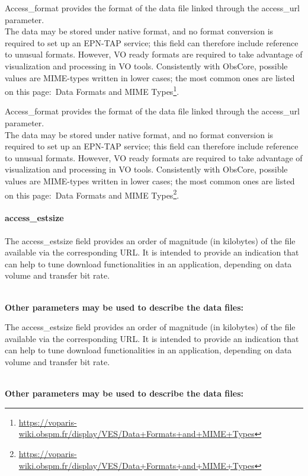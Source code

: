 \documentclass[11pt,a4paper]{ivoa}
\begin{document}
Access\_format provides the format of the data file linked through the access\_url parameter. \\The data may be stored under native format, and no format conversion is required to set up an EPN-TAP service; this field can therefore include reference to unusual formats. However, VO ready formats are required to take advantage of visualization and processing in VO tools. Consistently with ObsCore, possible values are MIME-types written in lower cases; the most common ones are listed on this page: Data Formats and MIME Types\footnote{\url{https://voparis-wiki.obspm.fr/display/VES/Data+Formats+and+MIME+Types}}.

Access\_format provides the format of the data file linked through the access\_url parameter. \\The data may be stored under native format, and no format conversion is required to set up an EPN-TAP service; this field can therefore include reference to unusual formats. However, VO ready formats are required to take advantage of visualization and processing in VO tools. Consistently with ObsCore, possible values are MIME-types written in lower cases; the most common ones are listed on this page: Data Formats and MIME Types\footnote{\url{https://voparis-wiki.obspm.fr/display/VES/Data+Formats+and+MIME+Types}}.

\paragraph{access\_estsize}

The access\_estsize field provides an order of magnitude (in kilobytes) of the file available via the corresponding URL. It is intended to provide an indication that can help to tune download functionalities in an application, depending on data volume and transfer bit rate.

\\

\textbf{Other parameters may be used to describe the data files:}

The access\_estsize field provides an order of magnitude (in kilobytes) of the file available via the corresponding URL. It is intended to provide an indication that can help to tune download functionalities in an application, depending on data volume and transfer bit rate.

\\

\textbf{Other parameters may be used to describe the data files:}
\end{document}
